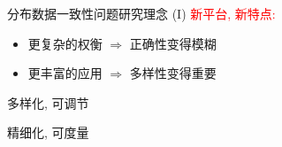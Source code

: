\begin{frame}{分布数据一致性问题研究理念 (I)}
  \textcolor{red}{新平台, 新特点:} 

  \begin{itemize}
	\item<2-> 更复杂的权衡 $\Longrightarrow$ 正确性变得模糊
	\item<3-> 更丰富的应用 $\Longrightarrow$ 多样性变得重要
  \end{itemize}



  \vspace{1.00cm}
  \begin{description}
	\centering
	\item<5>[理念一:] 多样化, 可调节
	\item<5>[理念二:] 精细化, 可度量
  \end{description}
\end{frame}
